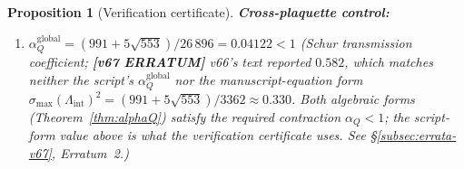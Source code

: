 \documentclass[11pt]{article}
\newtheorem{proposition}[theorem]{Proposition}
\theoremstyle{definition}
\begin{document}
\begin{proposition}[Verification certificate]
\noindent\textbf{Cross-plaquette control:}
\begin{enumerate}[nosep,label=(V\arabic*),resume]
\item $\alpha_Q^{\mathrm{global}}=(991+5\sqrt{553})/26\,896
=0.04122<1$
\quad\emph{(Schur transmission coefficient; \textbf{[v67 ERRATUM]}
v66's text reported $0.582$, which matches neither the script's
$\alpha_Q^{\mathrm{global}}$ nor the manuscript-equation form
$\sigma_{\max}(\Lambda_{\mathrm{int}})^2=(991+5\sqrt{553})/3362\approx 0.330$.
Both algebraic forms (Theorem~\ref{thm:alphaQ}) satisfy the required
contraction $\alpha_Q<1$; the script-form value above is what the
verification certificate uses.  See \S\ref{subsec:errata-v67}, Erratum~2.)}
\end{enumerate}
\end{proposition}
\end{document}
